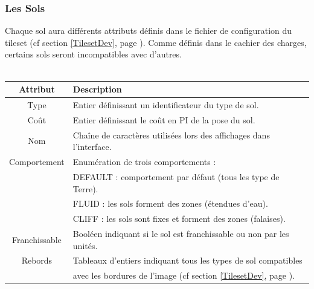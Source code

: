 \documentclass[a4paper]{article}
\newcommand{\alinea}{\hspace*{0.5cm}}
\begin{document}
        \subsubsection{Les Sols}
          \alinea Chaque sol aura différents attributs définis dans le fichier de configuration du tileset (cf section \ref{TilesetDev}, page \pageref{TilesetDev}). Comme définis dans le cachier des charges, certains sols seront incompatibles avec d'autres.\\
          \\
	  	  \begin{small}
			\begin{tabular}{| c | l |}
			  \hline
			  \textbf{Attribut} & \textbf{Description}\\
			  \hline
			  Type & Entier définissant un identificateur du type de sol.\\
			  \hline
			  Coût & Entier définissant le coût en PI de la pose du sol.\\
			  \hline
			  Nom & Chaîne de caractères utilisées lors des affichages dans l'interface.\\
			  \hline
			  Comportement & Enumération de trois comportements :\\
			  & DEFAULT : comportement par défaut (tous les type de Terre).\\
			  & FLUID : les sols forment des zones (étendues d'eau).\\
			  & CLIFF : les sols sont fixes et forment des zones (falaises).\\
			  \hline
			  Franchissable & Booléen indiquant si le sol est franchissable ou non par les unités.\\
			  \hline
			  Rebords & Tableaux d'entiers indiquant tous les types de sol compatibles\\
			  & avec les bordures de l'image (cf  section \ref{TilesetDev}, page \pageref{TilesetDev}).\\
			  \hline
			\end{tabular}
		  \end{small}
          
\end{document}
